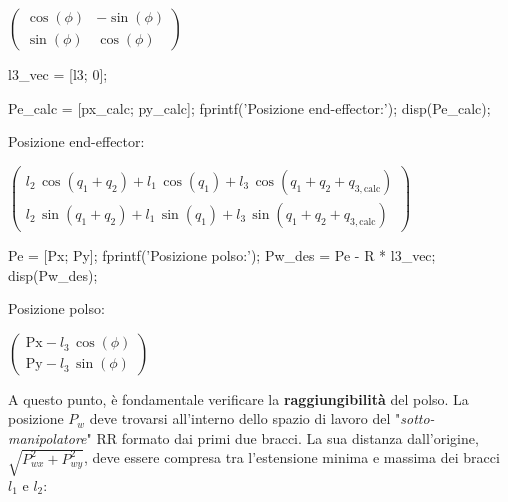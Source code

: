 \documentclass[11pt, a4paper]{article}
\begin{document}
\begin{matlabsymbolicoutput}
$\displaystyle \left(\begin{array}{cc}
\cos \left(\phi \right) & -\sin \left(\phi \right)\\
\sin \left(\phi \right) & \cos \left(\phi \right)
\end{array}\right)$
\end{matlabsymbolicoutput}

\begin{matlabcode}
l3_vec = [l3; 0];

Pe_calc = [px_calc; py_calc];
fprintf('Posizione end-effector:\n');
disp(Pe_calc);
\end{matlabcode}
\begin{matlaboutput}
Posizione end-effector:
\end{matlaboutput}
\begin{matlabsymbolicoutput}
$\displaystyle \left(\begin{array}{c}
l_2 \,\cos \left(q_1 +q_2 \right)+l_1 \,\cos \left(q_1 \right)+l_3 \,\cos \left(q_1 +q_2 +q_{3,\textrm{calc}} \right)\\
l_2 \,\sin \left(q_1 +q_2 \right)+l_1 \,\sin \left(q_1 \right)+l_3 \,\sin \left(q_1 +q_2 +q_{3,\textrm{calc}} \right)
\end{array}\right)$
\end{matlabsymbolicoutput}
\begin{matlabcode}

Pe = [Px; Py];
fprintf('Posizione polso:\n');
Pw_des = Pe - R * l3_vec;
disp(Pw_des);
\end{matlabcode}
\begin{matlaboutput}
Posizione polso:
\end{matlaboutput}
\begin{matlabsymbolicoutput}
$\displaystyle \left(\begin{array}{c}
\textrm{Px}-l_3 \,\cos \left(\phi \right)\\
\textrm{Py}-l_3 \,\sin \left(\phi \right)
\end{array}\right)$
\end{matlabsymbolicoutput}

\begin{par}
\begin{flushleft}
A questo punto, è fondamentale verificare la \textbf{raggiungibilità} del polso. La posizione $P_w$ deve trovarsi all'interno dello spazio di lavoro del "\textit{sotto-manipolatore}" RR formato dai primi due bracci. La sua distanza dall'origine, $\sqrt{P_{wx}^2 +P_{wy}^2 }$, deve essere compresa tra l'estensione minima e massima dei bracci $l_1$ e $l_2$:
\end{flushleft}
\end{par}
\end{document}
